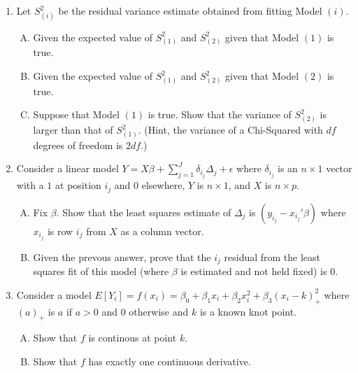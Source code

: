 \documentclass[12pt]{article}
\begin{document}
\begin{enumerate}[1.]
\item Let $S_{(i)}^2$ be the residual variance estimate obtained from fitting Model $(i)$.
\begin{enumerate}[A.]
\item Given the expected value of $S_{(1)}^2$ and $S_{(2)}^2$ given that Model $(1)$ is true.
\item Given the expected value of $S_{(1)}^2$ and $S_{(2)}^2$ given that Model $(2)$ is true.
\item Suppose that Model $(1)$ is true. Show that the variance of $S_{(2)}^2$ is larger than
that of $S_{(1)}^2$. (Hint, the variance of a Chi-Squared with $df$ degrees of freedom is $2df$.)
\end{enumerate}

\newpage

\item Consider a linear model $Y = X\beta + \sum_{j=1}^J \delta_{i_j} \Delta_j + \epsilon$ where $\delta_{i_j}$ is an
$n\times 1$ vector with a $1$ at position $i_j$ and $0$ elsewhere, $Y$ is $n\times 1$, and $X$ is $n \times p$. 
\begin{enumerate}[A.]
\item Fix $\beta$. Show that the least squares estimate of $\Delta_j$ is $(y_{i_j} - x_{i_j}' \beta)$ where
$x_{i_j}$ is row $i_j$ from $X$ as a column vector.
\item Given the prevous answer, prove that the $i_j$ residual from the least squares fit of this model (where $\beta$ is estimated and not held fixed) is $0$.
\end{enumerate}

\newpage
\item Consider a model $E[Y_{i}] = f(x_i) = \beta_0 + \beta_1 x_i + \beta_2 x_i^2 + \beta_3(x_i - k)_{+}^2 $ where
$(a)_{+}$ is $a$ if $a > 0$ and $0$ otherwise and $k$ is a known knot point.
\begin{enumerate}[A.]
\item Show that $f$ is continous at point $k$.
\item Show that $f$ has exactly one continuous derivative. 
\end{enumerate}




\end{enumerate}

\end{document}
